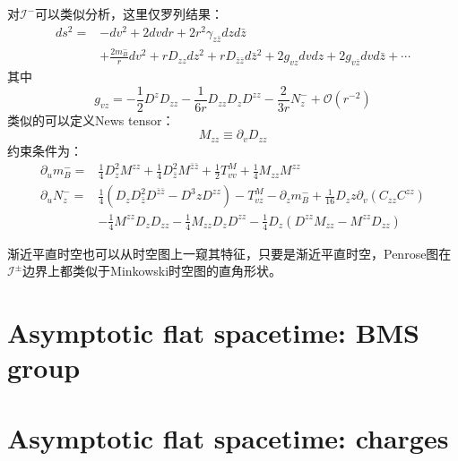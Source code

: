对$\mathcal{I}^{-}$可以类似分析，这里仅罗列结果：
\begin{equation}
	\begin{aligned}
		ds^2=&-dv^2+2dvdr+2r^2\gamma_{z\bar z}dzd{\bar z}\\
		&+\frac{2m^-_B}{r}dv^2+rD_{zz}dz^2+rD_{\bar z\bar z}d{\bar z}^2+2g_{vz}dvdz+2g_{v\bar z}dvd\bar z+\cdots
	\end{aligned}
\end{equation}
其中
\begin{equation}
	g_{vz}=-\frac{1}{2}D^zD_{zz}-\frac{1}{6r}D_{zz}D_zD^{zz}-\frac{2}{3r}N^-_z+\mathcal{O}(r^{-2})
\end{equation}
类似的可以定义News tensor：
\begin{equation}
	M_{zz}\equiv \partial_v D_{zz}
\end{equation}
约束条件为：
\begin{equation}
	\begin{aligned}
		\partial_u m^-_B=&\frac{1}{4}D_z^2M^{zz}+\frac{1}{4}D_{\bar z}^2M^{\bar z\bar z}+\frac{1}{2}T^M_{vv}+\frac{1}{4}M_{zz}M^{zz}\\
		\partial_u N^-_z=&\frac{1}{4}\left(D_zD_{\bar z}^2D^{\bar z\bar z}-D^3zD^{zz}\right)-T^{M}_{vz}-\partial_z m^-_B+\frac{1}{16}D_zz\partial_v(C_{zz}C^{zz})\\
		&-\frac{1}{4}M^{zz}D_zD_{zz}-\frac{1}{4}M_{zz}D_zD^{zz}-\frac{1}{4}D_z\left(D^{zz}M_{zz}-M^{zz}D_{zz}\right)
	\end{aligned}
\end{equation}

渐近平直时空也可以从时空图上一窥其特征\cite{zhaoliu}，只要是渐近平直时空，Penrose图在$\mathcal{I}^\pm$边界上都类似于Minkowski时空图的直角形状。

\section{Asymptotic flat spacetime: BMS group}
\section{Asymptotic flat spacetime: charges}